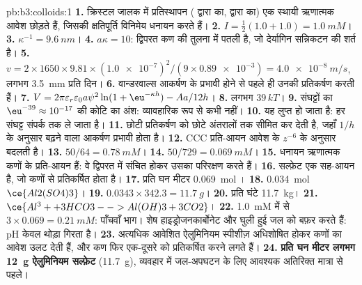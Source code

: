 \begin{solution}{pb:b3:colloids:1}
\textbf{1.} क्रिस्टल जालक में प्रतिस्थापन ( द्वारा  का,  द्वारा  का)
एक स्थायी ऋणात्मक आवेश छोड़ते हैं, जिसकी क्षतिपूर्ति विनिमेय धनायन करते हैं।
\textbf{2.} $I = \frac12(1.0 + 1.0) = \qty{1.0}{mM}$।
\textbf{3.} $\kappa^{-1} = \qty{9.6}{nm}$।
\textbf{4.} $a\kappa = 10$: द्विपरत कण की तुलना में पतली है, जो
देर्यागिन सन्निकटन की शर्त है।
\textbf{5.} $v = 2 \times 1650 \times 9.81 \times (\num{1.0e-7})^2/(9 \times \num{0.89e-3}) = \qty{4.0e-8}{m/s}$, लगभग \qty{3.5}{mm} प्रति दिन।
\textbf{6.} वान्डरवाल्स आकर्षण के प्रभावी होने से पहले ही उनकी  प्रतिकर्षण करती हैं।
\textbf{7.} $V = 2\pi\varepsilon_r\varepsilon_0a\psi^2\ln(1 + \eu^{-\kappa h}) - Aa/12h$।
\textbf{8.} लगभग $39\,kT$।
\textbf{9.} संघट्टों का $\eu^{-39} \approx 10^{-17}$ की कोटि का अंश: व्यावहारिक रूप से कभी नहीं।
\textbf{10.} यह लुप्त हो जाता है: हर संघट्ट संपर्क तक ले जाता है।
\textbf{11.} छोटी  प्रतिकर्षण को छोटे अंतरालों तक सीमित कर देती है, जहाँ
$1/h$ के अनुसार बढ़ने वाला आकर्षण प्रभावी होता है।
\textbf{12.} CCC प्रति-आयन आवेश के $z^{-6}$ के अनुसार बदलती है।
\textbf{13.} $50/64 = \qty{0.78}{mM}$।
\textbf{14.} $50/729 = \qty{0.069}{mM}$।
\textbf{15.} धनायन ऋणात्मक कणों के प्रति-आयन हैं: वे
द्विपरत में संचित होकर उसका परिरक्षण करते हैं।
\textbf{16.} सल्फ़ेट एक सह-आयन है, जो कणों से प्रतिकर्षित होता है।
\textbf{17.} प्रति घन मीटर \qty{0.069}{mol} ।
\textbf{18.} \qty{0.034}{mol} $\ce{Al2(SO4)3}$।
\textbf{19.} $0.0343 \times 342.3 = \qty{11.7}{g}$।
\textbf{20.} प्रति घंटे \qty{11.7}{kg}।
\textbf{21.} $\ce{Al^3+ + 3 HCO3- -> Al(OH)3 + 3 CO2}$।
\textbf{22.} \qty{1.0}{mM} में से $3 \times 0.069 = \qty{0.21}{mM}$: पाँचवाँ भाग। शेष
हाइड्रोजनकार्बोनेट और घुली हुई  जल को बफ़र करते हैं: pH केवल
थोड़ा गिरता है।
\textbf{23.} अत्यधिक आवेशित ऐलुमिनियम स्पीशीज़ अधिशोषित होकर कणों का आवेश उलट देती हैं,
और कण फिर एक-दूसरे को प्रतिकर्षित करने लगते हैं।
\textbf{24.} \textbf{प्रति घन मीटर लगभग \qty{12}{g} ऐलुमिनियम सल्फ़ेट} (\qty{11.7}{g}), व्यवहार में
जल-अपघटन के लिए आवश्यक अतिरिक्त मात्रा से पहले।
\end{solution}
